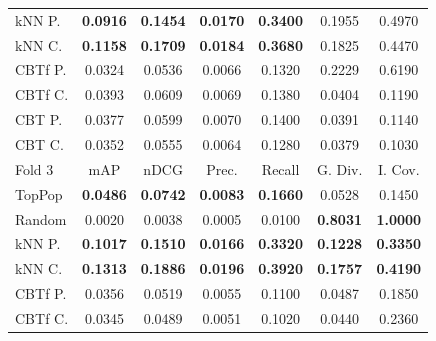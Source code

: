 \begin{table}[hbt]
\begin{tabulary}{\textwidth}{|L|CCCCCC|}
kNN P. & \textbf{0.0916} &  \textbf{0.1454} &  \textbf{0.0170} &  \textbf{0.3400} &                                            0.1955 &                                            0.4970 \\
kNN C. & \textbf{0.1158} &  \textbf{0.1709} &  \textbf{0.0184} &  \textbf{0.3680} &                                            0.1825 &                                            0.4470 \\
CBTf P. & 0.0324 &           0.0536 &           0.0066 &           0.1320 &                                            0.2229 &                                            0.6190 \\
CBTf C. & 0.0393 &           0.0609 &           0.0069 &           0.1380 &                                            0.0404 &                                            0.1190 \\
CBT P. & 0.0377 &           0.0599 &           0.0070 &           0.1400 &                                            0.0391 &                                            0.1140 \\
CBT C. & 0.0352 &           0.0555 &           0.0064 &           0.1280 &                                            0.0379 &                                            0.1030 \\
\hline
\hline
Fold 3 & mAP & nDCG & Prec. & Recall & G. Div. & I. Cov. \\
\hline
TopPop & \textbf{0.0486} &  \textbf{0.0742} &  \textbf{0.0083} &  \textbf{0.1660} &                                            0.0528 &                                            0.1450 \\
Random & 0.0020 &           0.0038 &           0.0005 &           0.0100 &                                   \textbf{0.8031} &                                   \textbf{1.0000} \\
kNN P. & \textbf{0.1017} &  \textbf{0.1510} &  \textbf{0.0166} &  \textbf{0.3320} &                                   \textbf{0.1228} &                                   \textbf{0.3350} \\
kNN C. & \textbf{0.1313} &  \textbf{0.1886} &  \textbf{0.0196} &  \textbf{0.3920} &                                   \textbf{0.1757} &                                   \textbf{0.4190} \\
CBTf P. & 0.0356 &           0.0519 &           0.0055 &           0.1100 &                                            0.0487 &                                            0.1850 \\
CBTf C. & 0.0345 &           0.0489 &           0.0051 &           0.1020 &                                            0.0440 &                                            0.2360 \\

\end{tabulary}
\end{table}
